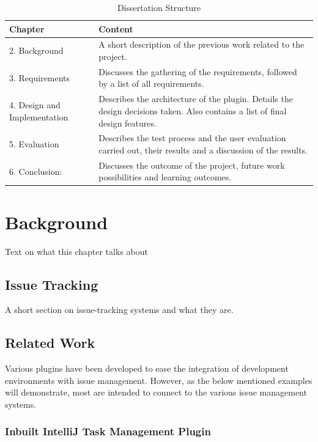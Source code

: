 \documentclass{4thYearProject}
\begin{document}
\begin{table}[H]
\caption{Dissertation Structure}
\centering
\def\arraystretch{1.5}
\begin{tabular}{p{3cm}p{12cm}}
\hline
Chapter & Content \\
\hline
2. Background & A short description of the previous work related to the project. \\
3. Requirements & Discusses the gathering of the requirements, followed by a list of all requirements. \\
4. Design and Implementation & Describes the architecture of the plugin. Details the design decisions taken. Also contains a list of final design features.\\
5. Evaluation & Describes the test process and the user evaluation carried out, their results and a discussion of the results. \\
6. Conclusion: & Discusses the outcome of the project, future work possibilities and learning outcomes.  \\
\hline
\end{tabular}
\label{table:reportStructure}
\end{table}


\chapter{Background}

Text on what this chapter talks about

\section{Issue Tracking}

A short section on issue-tracking systems and what they are.

\section{Related Work}

Various plugins have been developed to ease the integration of development environments with issue management. However, as the below mentioned examples will demonstrate, most are intended to connect to the various issue management systems. 

\subsection{Inbuilt IntelliJ Task Management Plugin}
\end{document}
